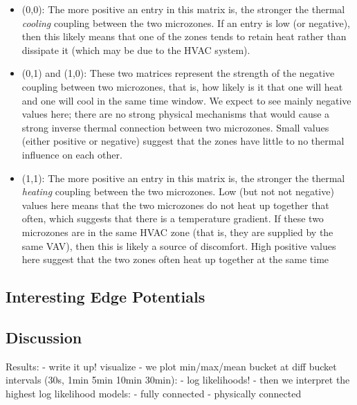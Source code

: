 \begin{itemize}[noitemsep,nolistsep]
\item (0,0): The more positive an entry in this matrix is, the stronger the thermal \emph{cooling} coupling between the two microzones. 
If an entry is low (or negative), then this likely means that one of the zones tends to retain heat rather than dissipate it (which may be due to the HVAC system).
\item (0,1) and (1,0): These two matrices represent the strength of the negative coupling between two microzones, that is, how likely is it that one will heat and one will cool in the same time window.
We expect to see mainly negative values here; there are no strong physical mechanisms that would cause a strong inverse thermal connection between two microzones.
Small values (either positive or negative) suggest that the zones have little to no thermal influence on each other.
\item (1,1): The more positive an entry in this matrix is, the stronger the thermal \emph{heating} coupling between the two microzones.
Low (but not not negative) values here means that the two microzones do not heat up together that often, which suggests that there is a temperature gradient.
If these two microzones are in the same HVAC zone (that is, they are supplied by the same VAV), then this is likely a source of discomfort.
High positive values here suggest that the two zones often heat up together at the same time
\end{itemize}

\subsection{Interesting Edge Potentials}

\subsection{Discussion}

Results:
- write it up! visualize
- we plot min/max/mean bucket at diff bucket intervals (30s, 1min 5min 10min 30min):
    - log likelihoods!
- then we interpret the highest log likelihood models:
    - fully connected
    - physically connected
\fi

